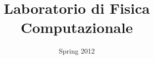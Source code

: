 \documentclass[a4paper,11pt]{report}
\title{\bfseries{\Huge{Laboratorio di Fisica Computazionale}}}
\author{\cursiveshape {Luca Cassia - [MAT. 728341]}}
\date{Spring 2012}
\begin{document}
\maketitle
\tableofcontents






{}

\end{document}
